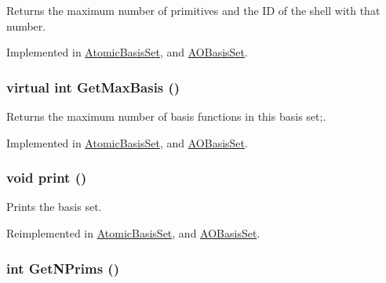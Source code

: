 Returns the maximum number of primitives and the ID of the shell with that number. 

Implemented in \hyperlink{classJKBuilder_1_1AtomicBasisSet_a03191bf41d6e3a2445dd3eb8640305be}{AtomicBasisSet}, and \hyperlink{classJKBuilder_1_1AOBasisSet_a03191bf41d6e3a2445dd3eb8640305be}{AOBasisSet}.\hypertarget{classJKBuilder_1_1BasisSet_a7c12871050e478f6a22c4c1c46bd4b21}{
\subsubsection[{GetMaxBasis}]{\setlength{\rightskip}{0pt plus 5cm}virtual int GetMaxBasis ()}}
\label{classJKBuilder_1_1BasisSet_a7c12871050e478f6a22c4c1c46bd4b21}


Returns the maximum number of basis functions in this basis set;. 

Implemented in \hyperlink{classJKBuilder_1_1AtomicBasisSet_adcda37af511d6b4f8d305fcba2da5c4a}{AtomicBasisSet}, and \hyperlink{classJKBuilder_1_1AOBasisSet_adcda37af511d6b4f8d305fcba2da5c4a}{AOBasisSet}.\hypertarget{classJKBuilder_1_1BasisSet_a388f572c62279f839ee138a9afbdeeb5}{
\subsubsection[{print}]{\setlength{\rightskip}{0pt plus 5cm}void print ()}}
\label{classJKBuilder_1_1BasisSet_a388f572c62279f839ee138a9afbdeeb5}


Prints the basis set. 

Reimplemented in \hyperlink{classJKBuilder_1_1AtomicBasisSet_a388f572c62279f839ee138a9afbdeeb5}{AtomicBasisSet}, and \hyperlink{classJKBuilder_1_1AOBasisSet_a388f572c62279f839ee138a9afbdeeb5}{AOBasisSet}.\hypertarget{classJKBuilder_1_1BasisSet_abc886cd4e35d3c56a0250b7d06986f61}{
\subsubsection[{GetNPrims}]{\setlength{\rightskip}{0pt plus 5cm}int GetNPrims ()}}
\label{classJKBuilder_1_1BasisSet_abc886cd4e35d3c56a0250b7d06986f61}


